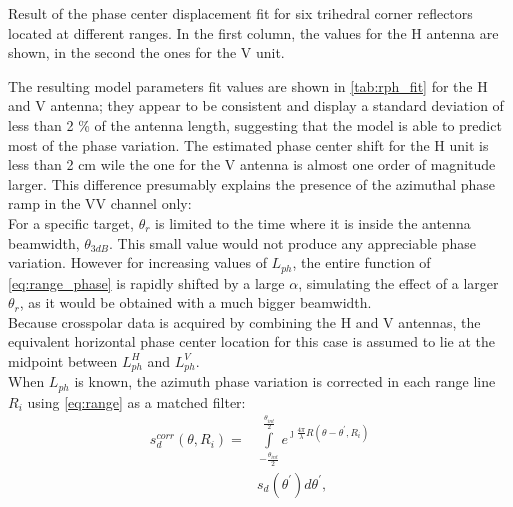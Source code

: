 \begin{table}[ht]
	\centering
	\caption{Result of the phase center displacement fit for six trihedral corner reflectors located at different ranges. In the first column, the values for the H antenna are shown, in the second the ones for the V unit.}
	\label{tab:rph_fit}
\end{table}
The resulting model parameters fit values  are shown in \autoref{tab:rph_fit} for the H and V antenna; they appear to be consistent and display a standard deviation of less than 2 \% of the antenna length, suggesting that the model is able to predict most of the phase variation. The estimated phase center shift for the H unit is less than 2 cm wile the one for the V antenna is almost one order of magnitude larger. This difference presumably explains the presence of the azimuthal phase ramp in the VV channel only:\\
For a specific target,  $\theta_r$ is limited to the time where it is inside the antenna beamwidth, $\theta_{3dB}$. This small value would not produce any appreciable phase variation. However for increasing values of $L_{ph}$, the entire function of \autoref{eq:range_phase} is rapidly shifted  by a large $\alpha$, simulating the effect of a larger $\theta_r$, as it would be obtained with a much bigger beamwidth.\\
Because crosspolar data is acquired by combining the H and V antennas, the equivalent horizontal phase center location for this case is assumed to lie at the midpoint between $L_{ph}^{H}$ and $L_{ph}^{V}$.\\
When $L_{ph}$ is known, the azimuth phase variation is corrected in each range line $R_{i}$ using \autoref{eq:range} as a matched filter:
\begin{equation}\label{eq:correction}
	\begin{aligned}
		s_{d}^{corr}\left(\theta, R_{i}\right) = &\int\limits_{-\frac{\theta_{int}}{2}}^{\frac{\theta_{int}}{2}}e^{\jmath \frac{4\pi}{\lambda}R\left(\theta - \theta^{\prime}, R_{i}\right)}\\
		&s_{d}\left(\theta^\prime\right) d\theta^\prime,
	\end{aligned}
\end{equation}

